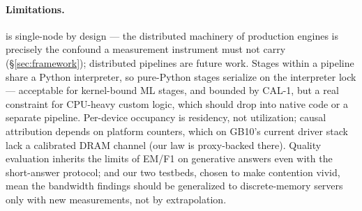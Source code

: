 \paragraph{Limitations.} \sysname{} is single-node by design --- the
distributed machinery of production engines is precisely the confound a
measurement instrument must not carry (\S\ref{sec:framework}); distributed
pipelines are future work. Stages within a pipeline share a Python
interpreter, so pure-Python stages serialize on the interpreter lock ---
acceptable for kernel-bound ML stages, and bounded by CAL-1, but a real
constraint for CPU-heavy custom logic, which should drop into native code or
a separate pipeline. Per-device occupancy is residency, not utilization;
causal attribution depends on platform counters, which on GB10's current
driver stack lack a calibrated DRAM channel (our law is proxy-backed there).
Quality evaluation inherits the limits of EM/F1 on generative answers even
with the short-answer protocol; and our two testbeds, chosen to make
contention vivid, mean the bandwidth findings should be generalized to
discrete-memory servers only with new measurements, not by extrapolation.
